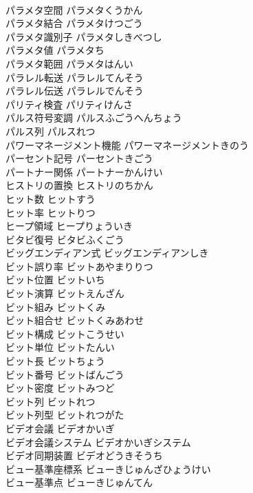 \documentclass[8pt]{extreport}
\begin{document}
\begin{CJK}{UTF8}{min}
\\	パラメタ空間	パラメタくうかん	
\\	パラメタ結合	パラメタけつごう	
\\	パラメタ識別子	パラメタしきべつし	
\\	パラメタ値	パラメタち	
\\	パラメタ範囲	パラメタはんい	
\\	パラレル転送	パラレルてんそう	
\\	パラレル伝送	パラレルでんそう	
\\	パリティ検査	パリティけんさ	
\\	パルス符号変調	パルスふごうへんちょう	
\\	パルス列	パルスれつ	
\\	パワーマネージメント機能	パワーマネージメントきのう	
\\	パーセント記号	パーセントきごう	
\\	パートナー関係	パートナーかんけい	
\\	ヒストリの置換	ヒストリのちかん	
\\	ヒット数	ヒットすう	
\\	ヒット率	ヒットりつ	
\\	ヒープ領域	ヒープりょういき	
\\	ビタビ復号	ビタビふくごう	
\\	ビッグエンディアン式	ビッグエンディアンしき	
\\	ビット誤り率	ビットあやまりりつ	
\\	ビット位置	ビットいち	
\\	ビット演算	ビットえんざん	
\\	ビット組み	ビットくみ	
\\	ビット組合せ	ビットくみあわせ	
\\	ビット構成	ビットこうせい	
\\	ビット単位	ビットたんい	
\\	ビット長	ビットちょう	
\\	ビット番号	ビットばんごう	
\\	ビット密度	ビットみつど	
\\	ビット列	ビットれつ	
\\	ビット列型	ビットれつがた	
\\	ビデオ会議	ビデオかいぎ	
\\	ビデオ会議システム	ビデオかいぎシステム	
\\	ビデオ同期装置	ビデオどうきそうち	
\\	ビュー基準座標系	ビューきじゅんざひょうけい	
\\	ビュー基準点	ビューきじゅんてん	

\end{CJK}
\end{document}
